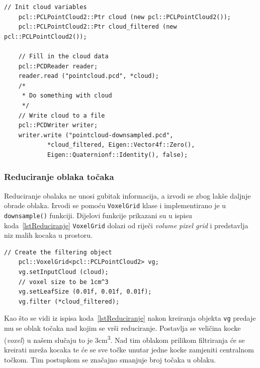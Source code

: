 \begin{lstlisting}[label=lstUcitavanjeOblaka, caption={Primjer izvornog
koda za učitavanje oblaka točaka}]
    // Init cloud variables 
    pcl::PCLPointCloud2::Ptr cloud (new pcl::PCLPointCloud2());
    pcl::PCLPointCloud2::Ptr cloud_filtered (new pcl::PCLPointCloud2());

    // Fill in the cloud data
    pcl::PCDReader reader;
    reader.read ("pointcloud.pcd", *cloud);
    /* 
     * Do something with cloud
     */
    // Write cloud to a file
    pcl::PCDWriter writer;
    writer.write ("pointcloud-downsampled.pcd",
            *cloud_filtered, Eigen::Vector4f::Zero(),
            Eigen::Quaternionf::Identity(), false);
\end{lstlisting}


\subsubsection{Reduciranje oblaka točaka} %
\label{ssub:Reduciranje oblaka točaka}
Reduciranje obalaka ne unosi gubitak informacija, a izvodi se zbog lakše
daljnje obrade oblaka. Izvodi se pomoću \texttt{VoxelGrid} klase i
implementirano je u \texttt{downsample()} funkciji. Dijelovi funkcije
prikazani su u ispisu koda~\ref{lstReduciranje}
\texttt{VoxelGrid} dolazi od riječi \textit{volume pixel grid} i
predstavlja niz malih kocaka u prostoru.

\begin{lstlisting}[label=lstReduciranje, caption={Dio izvornog koda za
reduciranje točaka iz funkcije \texttt{downsample()} }]
    // Create the filtering object
    pcl::VoxelGrid<pcl::PCLPointCloud2> vg;
    vg.setInputCloud (cloud);
    // voxel size to be 1cm^3
    vg.setLeafSize (0.01f, 0.01f, 0.01f);
    vg.filter (*cloud_filtered);
\end{lstlisting}

Kao što se vidi iz ispisa koda~\ref{lstReduciranje} nakon kreiranja
objekta \texttt{vg} predaje mu se oblak točaka nad kojim se vrši
reduciranje. Postavlja se veličina kocke (\textit{voxel}) u našem
slučaju to je 3cm\textsuperscript{3}. Nad tim oblakom prilikom
filtriranja će se kreirati mreža kocaka te će se sve točke unutar jedne
kocke zamjeniti centralnom točkom. Tim postupkom se značajno smanjuje
broj točaka u oblaku.

